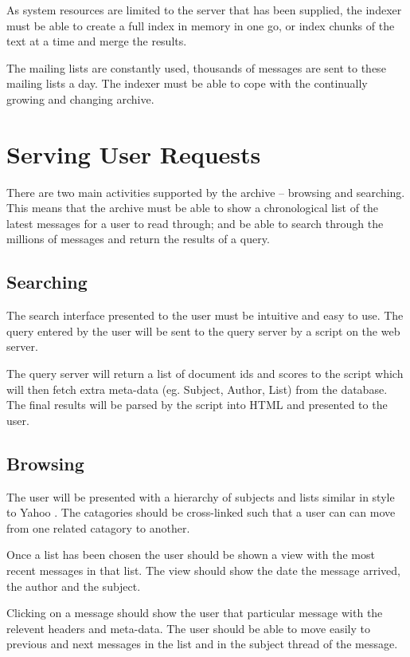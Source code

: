 As system resources are limited to the server that has been supplied, the
indexer must be able to create a full index in memory in one go, or index
chunks of the text at a time and merge the results.

The mailing lists are constantly used, thousands of messages are sent to
these mailing lists a day.  The indexer must be able to cope with
the continually growing and changing archive.

\section{Serving User Requests}
There are two main activities supported by the archive -- browsing and
searching.  This means that the archive must be able to show a
chronological list of the latest messages for a user to read through; and
be able to search through the millions of messages and return the results
of a query.

\subsection{Searching}
The search interface presented to the user must be intuitive and easy to
use.  The query entered by the user will be sent to the query server by a
script on the web server.

The query server will return a list of document ids and scores to the
script which will then fetch extra meta-data (eg. Subject, Author, List)
from the database.  The final results will be parsed by the script into
HTML and presented to the user.

\subsection{Browsing}
The user will be presented with a hierarchy of subjects and lists similar
in style to Yahoo \cite{www:yahoo}.  The catagories should be cross-linked
such that a user can can move from one related catagory to another.

Once a list has been chosen the user should be shown a view with the
most recent messages in that list.  The view should show the date the
message arrived, the author and the subject.

Clicking on a message should show the user that particular message with
the relevent headers and meta-data.  The user should be able to move
easily to previous and next messages in the list and in the subject thread
of the message.

